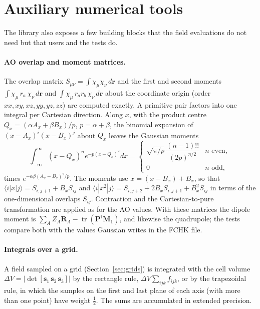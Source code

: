 \documentclass[11pt,a4paper]{article}
\begin{document}
\section{Auxiliary numerical tools}\label{sec:auxiliary}

The library also exposes a few building blocks that the field evaluations
do not need but that users and the tests do.

\paragraph{AO overlap and moment matrices.} The overlap matrix
$S_{\mu\nu}=\int\chi_\mu\chi_\nu\,d\mathbf r$ and the first and second
moments $\int\chi_\mu\,r_a\,\chi_\nu\,d\mathbf r$ and
$\int\chi_\mu\,r_ar_b\,\chi_\nu\,d\mathbf r$ about the coordinate origin
(order $xx,xy,xz,yy,yz,zz$) are computed exactly. A primitive pair factors
into one integral per Cartesian direction. Along $x$, with the product
centre $Q_x=(\alpha A_x+\beta B_x)/p$, $p=\alpha+\beta$, the binomial
expansion of $(x-A_x)^i(x-B_x)^j$ about $Q_x$ leaves the Gaussian moments
\begin{equation}
 \int_{-\infty}^{\infty}(x-Q_x)^ne^{-p(x-Q_x)^2}dx=
 \begin{cases}\sqrt{\pi/p}\,\dfrac{(n-1)!!}{(2p)^{n/2}}&n\text{ even},\\[1ex]
 0&n\text{ odd},\end{cases}
\end{equation}
times $e^{-\alpha\beta(A_x-B_x)^2/p}$. The moments use
$x=(x-B_x)+B_x$, so that $\langle i|x|j\rangle=S_{i,j+1}+B_xS_{ij}$ and
$\langle i|x^2|j\rangle=S_{i,j+2}+2B_xS_{i,j+1}+B_x^2S_{ij}$ in terms of the
one-dimensional overlaps $S_{ij}$. Contraction and the Cartesian-to-pure
transformation are applied as for the AO values. With these matrices the
dipole moment is $\sum_AZ_A\mathbf R_A-\operatorname{tr}(\mathbf P^{\mathrm t}\mathbf M_1)$,
and likewise the quadrupole; the tests compare both with the values
Gaussian writes in the FCHK file.

\paragraph{Integrals over a grid.} A field sampled on a grid
(Section~\ref{sec:grids}) is integrated with the cell volume
$\Delta V=|\det[\mathbf s_1\,\mathbf s_2\,\mathbf s_3]|$ by the rectangle
rule, $\Delta V\sum_{ijk}f_{ijk}$, or by the trapezoidal rule, in which
the samples on the first and last plane of each axis (with more than one
point) have weight $\frac12$. The sums are accumulated in extended
precision.
\end{document}
